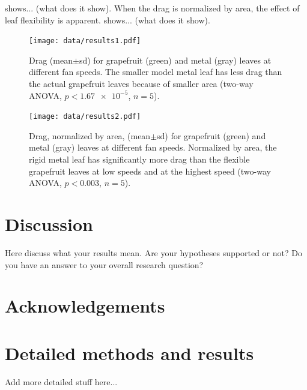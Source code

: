 \documentclass{article}
\begin{document}
 shows... (what does it show). When the drag is normalized by area, the effect of leaf flexibility is apparent.  shows... (what does it show). 

\begin{figure}
\begin{center}
\texttt{[image: data/results1.pdf]}
\end{center}
\caption{Drag (mean$\pm$sd) for grapefruit (green) and metal (gray) leaves at different fan speeds. The smaller model metal leaf has less drag than the actual grapefruit leaves because of smaller area (two-way ANOVA, $p<\num{1.67e-5}$, $n=5$).}
\label{fig:results1}
\end{figure}

\begin{figure}
\begin{center}
\texttt{[image: data/results2.pdf]}
\end{center}
\caption{Drag, normalized by area, (mean$\pm$sd) for grapefruit (green) and metal (gray) leaves at different fan speeds. Normalized by area, the rigid metal leaf has significantly more drag than the flexible grapefruit leaves at low speeds and at the highest speed (two-way ANOVA, $p<0.003$, $n=5$).}
\label{fig:results2}
\end{figure}


\section{Discussion}
Here discuss what your results mean. Are your hypotheses supported or not? Do you have an answer to your overall research question?

\section{Acknowledgements}



\clearpage
\appendix
\section{Detailed methods and results}
\label{app:A}
Add more detailed stuff here... 
\end{document}
